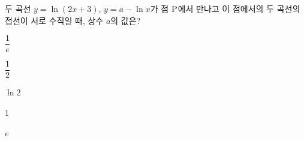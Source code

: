 두 곡선 $y=\ln(2x+3)$, $y=a-\ln x$가 점 $\mathrm{P}$에서 만나고 이 점에서의 두 곡선의 접선이 서로 수직일 때, 상수 $a$의 값은?
\begin{choices32}{\rule[-3ex]{0pt}{8ex}$\dfrac{1}{e}$}{\rule[-3ex]{0pt}{8ex}$\dfrac{1}{2}$}{\rule[-3ex]{0pt}{8ex}$\ln 2$}{\rule[-3ex]{0pt}{8ex}$1$}{\rule[-3ex]{0pt}{8ex}$e$}\end{choices32}
